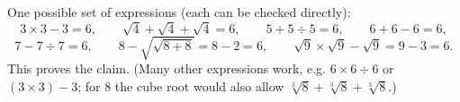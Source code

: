 One possible set of expressions (each can be checked directly):
\[3\times3-3=6,\qquad\sqrt4+\sqrt4+\sqrt4=6,\qquad5+5\div5=6,\qquad6+6-6=6,\]
\[7-7\div7=6,\qquad8-\sqrt{\sqrt{8+8}}=8-2=6,\qquad\sqrt9\times\sqrt9-\sqrt9=9-3=6.\]
This proves the claim. (Many other expressions work, e.g. $6\times6\div6$ or $(3\times3)-3$; for $8$ the cube root would also allow $\sqrt[3]8+\sqrt[3]8+\sqrt[3]8$.)
